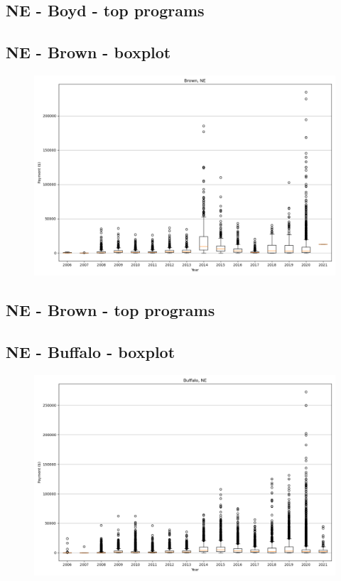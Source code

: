 \subsection*{NE - Boyd - top programs}

\newpage
\subsection*{NE - Brown - boxplot}
\begin{figure}[h]
\centering
\includegraphics[width=7in]{../output/boxplots/counties/Brown-NE_boxplot.png}
\end{figure}


\subsection*{NE - Brown - top programs}

\newpage
\subsection*{NE - Buffalo - boxplot}
\begin{figure}[h]
\centering
\includegraphics[width=7in]{../output/boxplots/counties/Buffalo-NE_boxplot.png}
\end{figure}


